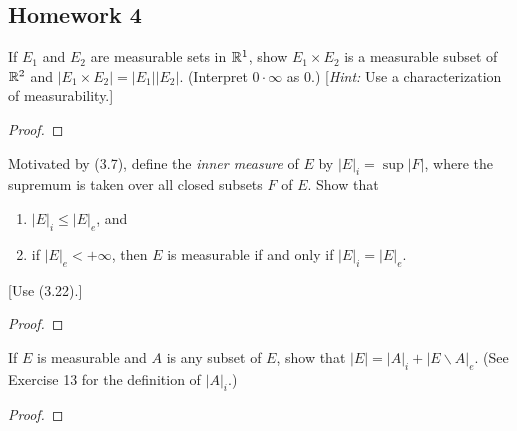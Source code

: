 \subsection{Homework 4}

\begin{problem}
If $E_1$ and $E_2$ are measurable sets in $\mathbb{R}^1$, show $E_1\times E_2$ is
a measurable subset of $\mathbb{R}^2$ and $|E_1\times E_2|=|E_1||E_2|$. (Interpret
$0\cdot\infty$ as $0$.) [\emph{Hint:} Use a characterization of
measurability.]
\end{problem}
\begin{proof}
\end{proof}

\begin{problem}
Motivated by (3.7), define the \emph{inner measure} of $E$ by
$|E|_i=\sup|F|$, where the supremum is taken over all closed subsets $F$ of
$E$. Show that
\begin{enumerate}[label=(\roman*),noitemsep]
\item $|E|_i\leq|E|_e$, and
\item if $|E|_e<+\infty$, then $E$ is measurable if and only if
  $|E|_i=|E|_e$.
\end{enumerate}
[Use (3.22).]
\end{problem}
\begin{proof}
\end{proof}

\begin{problem}
If $E$ is measurable and $A$ is any subset of $E$, show that
$|E|=|A|_i+|E\smallsetminus A|_e$. (See Exercise 13 for
the definition of $|A|_i$.)
\end{problem}
\begin{proof}
\end{proof}

